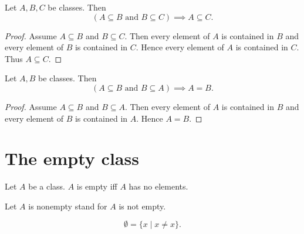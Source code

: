 \documentclass[../../set-theory/set-theory.tex]{subfiles}
\begin{document}
  \begin{forthel}
    \begin{proposition}
      Let $A, B, C$ be classes.
      Then \[ (\text{$A \subseteq B$ and $B \subseteq C$}) \implies
      A \subseteq C. \]
    \end{proposition}
    \begin{proof}
      Assume $A \subseteq B$ and $B \subseteq C$.
      Then every element of $A$ is contained in $B$ and every element of $B$ is
      contained in $C$.
      Hence every element of $A$ is contained in $C$.
      Thus $A \subseteq C$.
    \end{proof}
  \end{forthel}

  \begin{forthel}
    \begin{proposition}
      Let $A, B$ be classes.
      Then \[ (\text{$A \subseteq B$ and $B \subseteq A$}) \implies A = B. \]
    \end{proposition}
    \begin{proof}
      Assume $A \subseteq B$ and $B \subseteq A$.
      Then every element of $A$ is contained in $B$ and every element of $B$ is
      contained in $A$.
      Hence $A = B$.
    \end{proof}
  \end{forthel}


  \section{The empty class}

  \begin{forthel}
    \begin{definition}
      Let $A$ be a class.
      $A$ is empty iff $A$ has no elements.
    \end{definition}

    Let $A$ is nonempty stand for $A$ is not empty.
  \end{forthel}

  \begin{forthel}
    \begin{definition}
      \[ \emptyset = \{ x \mid x \neq x \}. \]
    \end{definition}
  \end{forthel}
\end{document}

